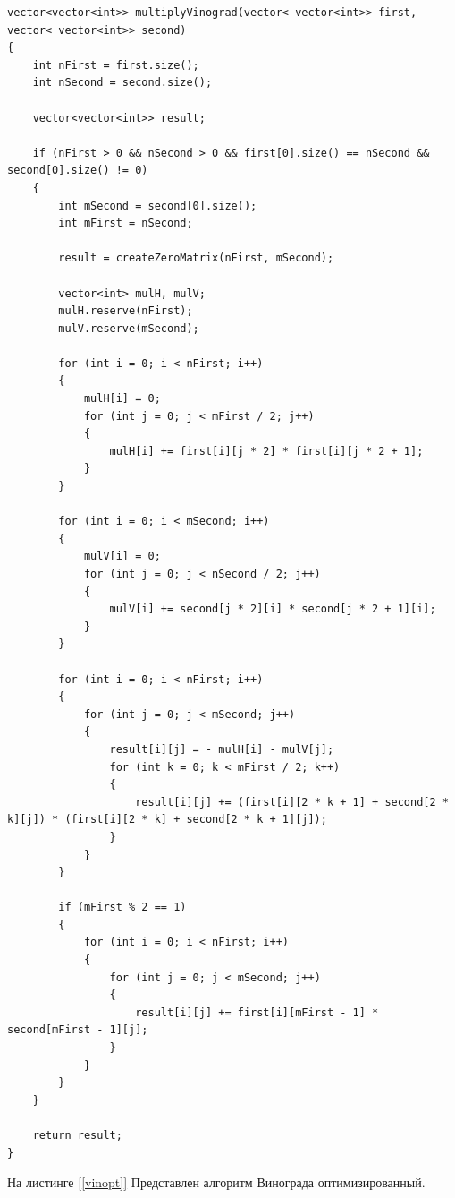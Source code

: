 \documentclass{article}
\begin{document}
	\begin{lstlisting}[label=vin,caption=Алгоритм Винограда]
	vector<vector<int>> multiplyVinograd(vector< vector<int>> first, vector< vector<int>> second)
{
    int nFirst = first.size();
    int nSecond = second.size();
   
    vector<vector<int>> result;

    if (nFirst > 0 && nSecond > 0 && first[0].size() == nSecond && second[0].size() != 0)
    {
        int mSecond = second[0].size();
        int mFirst = nSecond;

        result = createZeroMatrix(nFirst, mSecond);

        vector<int> mulH, mulV;
        mulH.reserve(nFirst);
        mulV.reserve(mSecond);

        for (int i = 0; i < nFirst; i++)
        {
            mulH[i] = 0;
            for (int j = 0; j < mFirst / 2; j++)
            {
                mulH[i] += first[i][j * 2] * first[i][j * 2 + 1];
            }
        }

        for (int i = 0; i < mSecond; i++)
        {
            mulV[i] = 0;
            for (int j = 0; j < nSecond / 2; j++)
            {
                mulV[i] += second[j * 2][i] * second[j * 2 + 1][i];
            }
        }

        for (int i = 0; i < nFirst; i++)
        {
            for (int j = 0; j < mSecond; j++)
            {
                result[i][j] = - mulH[i] - mulV[j];
                for (int k = 0; k < mFirst / 2; k++)
                {
                    result[i][j] += (first[i][2 * k + 1] + second[2 * k][j]) * (first[i][2 * k] + second[2 * k + 1][j]);
                }
            }
        }

        if (mFirst % 2 == 1)
        {
            for (int i = 0; i < nFirst; i++)
            {
                for (int j = 0; j < mSecond; j++)
                {
                    result[i][j] += first[i][mFirst - 1] * second[mFirst - 1][j];
                }
            }
        }
    }

    return result;
}
	\end{lstlisting}
		На листинге \hyperref[vinopt]{[\ref{vinopt}]} Представлен алгоритм Винограда оптимизированный.
\end{document}
